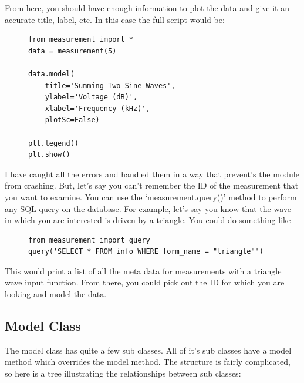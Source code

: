 \documentclass{article}
\begin{document}
From here, you should have enough information to plot the data and give it
an accurate title, label, etc. In this case the full script would be:

\begin{figure}[H]
\centering
\begin{minipage}{1\textwidth}
\begin{tcolorbox}
\begin{verbatim}
from measurement import *
data = measurement(5)

data.model(
    title='Summing Two Sine Waves', 
    ylabel='Voltage (dB)', 
    xlabel='Frequency (kHz)', 
    plotSc=False)

plt.legend()
plt.show()
\end{verbatim}
\end{tcolorbox}
\end{minipage}
\end{figure}

I have caught all the errors and handled them in a way that prevent's the
module from crashing. But, let's say you can't remember the ID of the
measurement that you want to examine. You can use the `measurement.query()'
method to perform any SQL query on the database. For example, let's say you
know that the wave in which you are interested is driven by a triangle. You
could do something like

\begin{figure}[H]
\centering
\begin{minipage}{1\textwidth}
\begin{tcolorbox}
\begin{verbatim}
from measurement import query
query('SELECT * FROM info WHERE form_name = "triangle"')
\end{verbatim}
\end{tcolorbox}
\end{minipage}
\end{figure}

This would print a list of all the meta data for measurements with a triangle
wave input function. From there, you could pick out the ID for which you are
looking and model the data.


\subsection{Model Class}%
\label{sub:model_class}

The model class has quite a few sub classes. All of it's sub classes have a
model method which overrides the model method. The structure is fairly
complicated, so here is a tree illustrating the relationships between sub
classes:
\end{document}
